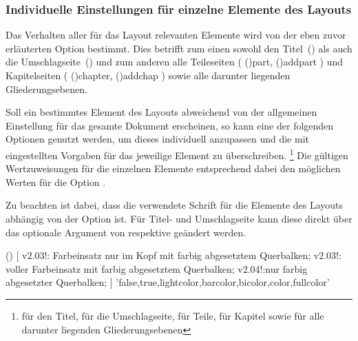 \begin{DeclareEntity*}{}
\begin{DeclareEntity*}{}
\begin{DeclareEntity*}{}
\subsubsection{Individuelle Einstellungen für einzelne Elemente des Layouts}

\newcommand*\cdalias{false,true,lightcolor,barcolor,bicolor,color,fullcolor}%
Das Verhalten aller für das Layout relevanten Elemente wird von der eben zuvor 
erläuterten Option  bestimmt. Dies betrifft zum einen sowohl 
den Titel~() als auch die Umschlagseite~() 
und zum anderen alle Teileseiten
(%
  \Macro(){part},
  \Macro(){addpart}%
)
und Kapitelseiten
(%
  \Macro(){chapter},
  \Macro(){addchap}%
)
sowie alle darunter liegenden Gliederungsebenen.

Soll ein bestimmtes Element des Layouts abweichend von der allgemeinen 
Einstellung für das gesamte Dokument erscheinen, so kann eine der folgenden 
Optionen genutzt werden, um dieses individuell anzupassen und die mit 
 eingestellten Vorgaben für das jeweilige Element zu 
überschreiben.%
\footnote{%
   für den Titel,  für die Umschlagseite,
   für Teile,  für Kapitel sowie
   für alle darunter liegenden Gliederungsebenen%
}
Die gültigen Wertzuweisungen für die einzelnen Elemente entsprechend dabei den 
möglichen Werten für die Option . 

Zu beachten ist dabei, dass die verwendete Schrift für die Elemente des Layouts 
abhängig von der Option  ist. Für Titel- und Umschlagseite
kann diese direkt über das optionale Argument von  respektive 
 geändert werden.

\begin{Declaration}
  {}
  ()
[%
  v2.03!:%
    Farbeinsatz nur im Kopf mit farbig abgesetztem Querbalken;
  v2.03!:%
    voller Farbeinsatz mit farbig abgesetztem Querbalken;
  v2.04!:nur farbig abgesetzter Querbalken;%
]
  '\cdalias'
\printdeclarationlist[Titel|?]


\end{Declaration}
\end{DeclareEntity*}
\end{DeclareEntity*}
\end{DeclareEntity*}

